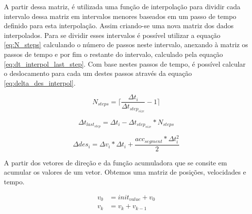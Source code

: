 A partir dessa matriz, é utilizada uma função de interpolação para dividir cada intervalo dessa matriz em intervalos menores
baseados em um passo de tempo definido para esta interpolação.
Assim criando-se uma nova matriz dos dados interpolados.
Para se dividir esses intervalos é possível utilizar a equação \ref{eq:N_steps}
calculando o número de passos neste intervalo, anexando à matriz os passos de tempo e por fim
o restante do intervalo, calculado pela equação \ref{eq:dt_interpol_last_step}.
Com base nestes passos de tempo, é possível calcular o deslocamento para cada um destes passos
através da equação \ref{eq:delta_des_interpol}.

\begin{equation}
    \label{eq:N_steps}
    N_{steps} = \lceil\frac{\Delta t_i}{\Delta t_{step_{size}}}-1\rceil
\end{equation}

\begin{equation}
    \label{eq:dt_interpol_last_step}
    \Delta t_{last_{step}}= \Delta t_i - \Delta t_{step_{size}}*N_{steps} 
\end{equation}

\begin{equation}
    \label{eq:delta_des_interpol}
    \Delta des_i = \Delta v_i*\Delta t_i+ \frac{acc_{segment}*\Delta t_i^2}{2} 
\end{equation}

A partir dos vetores de direção e da função acumuladora que se consite em acumular os valores de um vetor.
Obtemos uma matriz de posições, velocidades e tempo.

\begin{equation}
    \label{eq:acumulator_function}
    \begin{split}
        v_{0} &= init_{value} + v_{0} \\
        v_k &= v_k+v_{k-1}
    \end{split}
\end{equation}




    

